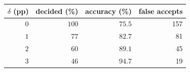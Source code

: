 \begin{tabular}{rrrr}
\toprule
$\delta$ (pp) & decided (\%) & accuracy (\%) & false accepts \\
\midrule
$0$ & $100$ & $75.5$ & 157 \\
$1$ & $77$ & $82.7$ & 81 \\
$2$ & $60$ & $89.1$ & 45 \\
$3$ & $46$ & $94.7$ & 19 \\
\bottomrule
\end{tabular}
